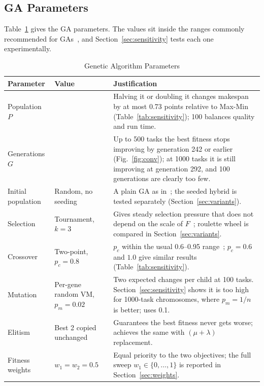 \documentclass[journal,onecolumn,12pt]{IEEEtran}
\begin{document}
\subsection{GA Parameters}
Table~\ref{tab:gaparams} gives the GA parameters. The values sit inside the ranges commonly recommended for GAs~\cite{dejong,grefenstette}, and Section~\ref{sec:sensitivity} tests each one experimentally.

\begin{table}[!htbp]
\caption{Genetic Algorithm Parameters}
\label{tab:gaparams}
\centering
\small
\begin{tabularx}{\textwidth}{@{}>{\raggedright\arraybackslash}p{2.8cm}>{\raggedright\arraybackslash}p{3.5cm}>{\raggedright\arraybackslash}X@{}}
\toprule
Parameter & Value & Justification \\
\midrule
Population $P$ & 100 & Halving it or doubling it changes makespan by at most 0.73 points relative to Max-Min (Table~\ref{tab:sensitivity}); 100 balances quality and run time. \\
Generations $G$ & 300 & Up to 500 tasks the best fitness stops improving by generation 242 or earlier (Fig.~\ref{fig:conv}); at 1000 tasks it is still improving at generation 292, and 100 generations are clearly too few. \\
Initial population & Random, no seeding & A plain GA as in~\cite{dehury}; the seeded hybrid is tested separately (Section~\ref{sec:variants}). \\
Selection & Tournament, $k=3$ & Gives steady selection pressure that does not depend on the scale of $F$~\cite{goldberg}; roulette wheel is compared in Section~\ref{sec:variants}. \\
Crossover & Two-point, $p_c=0.8$ & $p_c$ within the usual 0.6--0.95 range~\cite{dejong,grefenstette}; $p_c=0.6$ and $1.0$ give similar results (Table~\ref{tab:sensitivity}). \\
Mutation & Per-gene random VM, $p_m=0.02$ & Two expected changes per child at 100 tasks. Section~\ref{sec:sensitivity} shows it is too high for 1000-task chromosomes, where $p_m=1/n$~\cite{back} is better; \cite{dehury} uses 0.1. \\
Elitism & Best 2 copied unchanged & Guarantees the best fitness never gets worse; \cite{dehury} achieves the same with $(\mu+\lambda)$ replacement. \\
Fitness weights & $w_1=w_2=0.5$ & Equal priority to the two objectives; the full sweep $w_1\in\{0,\dots,1\}$ is reported in Section~\ref{sec:weights}. \\
\bottomrule
\end{tabularx}
\end{table}
\end{document}
